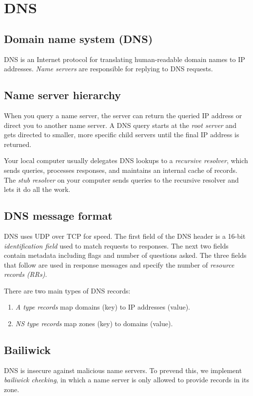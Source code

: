 \chapter{DNS}

\section{Domain name system (DNS)}
DNS is an Internet protocol for translating human-readable domain names to IP addresses. \emph{Name servers} are responsible for replying to DNS requests. 

\section{Name server hierarchy}
When you query a name server, the server can return the queried IP address or direct you to another name server. A DNS query starts at the \emph{root server} and gets directed to smaller, more specific child servers until the final IP address is returned.

\medskip
Your local computer usually delegates DNS lookups to a \emph{recursive resolver}, which sends queries, processes responses, and maintains an internal cache of records. The \emph{stub resolver} on your computer sends queries to the recursive resolver and lets it do all the work.

\section{DNS message format}
DNS uses UDP over TCP for speed. The first field of the DNS header is a 16-bit \emph{identification field} used to match requests to responses. The next two fields contain metadata including flags and number of questions asked. The three fields that follow are used in response messages and specify the number of \emph{resource records (RRs)}.

\medskip
There are two main types of DNS records:
\begin{enumerate}
    \item \emph{A type records} map domains (key) to IP addresses (value).
    \item \emph{NS type records} map zones (key) to domains (value).
\end{enumerate}

\section{Bailiwick}
DNS is insecure against malicious name servers. To prevend this, we implement \emph{bailiwick checking}, in which a name server is only allowed to provide records in its zone.

